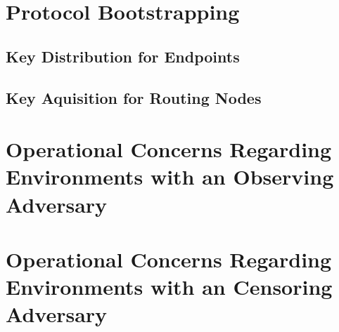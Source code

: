 \chapter{Protocol Bootstrapping}\label{sec:keyDistribution}
\section{Key Distribution for Endpoints}
\section{Key Aquisition for Routing Nodes}


\chapter{Operational Concerns Regarding Environments with an Observing Adversary}

\chapter{Operational Concerns Regarding Environments with an Censoring Adversary}



